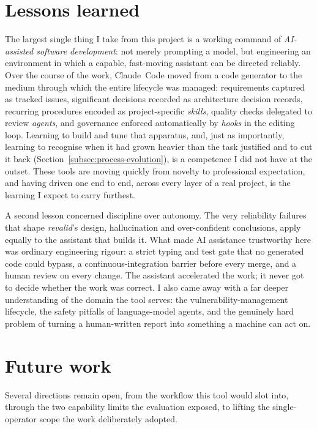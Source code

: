 \section{Lessons learned}
\label{sec:lessons}

The largest single thing I take from this project is a working command of
\emph{AI-assisted software development}: not merely prompting a model, but
engineering an environment in which a capable, fast-moving assistant can be directed
reliably. Over the course of the work, Claude~Code moved from a code generator to the
medium through which the entire lifecycle was managed: requirements captured as
tracked issues, significant decisions recorded as architecture decision records,
recurring procedures encoded as project-specific \emph{skills}, quality checks
delegated to review \emph{agents}, and governance enforced automatically by
\emph{hooks} in the editing loop. Learning to build and tune that apparatus, and,
just as importantly, learning to recognise when it had grown heavier than the task
justified and to cut it back (Section~\ref{subsec:process-evolution}), is a
competence I did not have at the outset. These tools are moving quickly from novelty
to professional expectation, and having driven one end to end, across every layer of
a real project, is the learning I expect to carry furthest.

A second lesson concerned discipline over autonomy. The very reliability failures that
shape \emph{revalid}'s design, hallucination and over-confident conclusions, apply
equally to the assistant that builds it. What made AI assistance trustworthy here was
ordinary engineering rigour: a strict typing and test gate that no generated code
could bypass, a continuous-integration barrier before every merge, and a human review
on every change. The assistant accelerated the work; it never got to decide whether
the work was correct. I also came away with a far deeper understanding of the domain
the tool serves: the vulnerability-management lifecycle, the safety pitfalls of
language-model agents, and the genuinely hard problem of turning a human-written
report into something a machine can act on.

\section{Future work}
\label{sec:future}

Several directions remain open, from the workflow this tool would slot into, through
the two capability limits the evaluation exposed, to lifting the single-operator
scope the work deliberately adopted.

